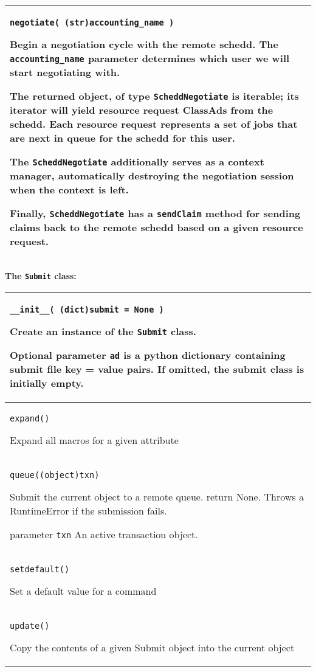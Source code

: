 \begin{flushleft}
\begin{tabular}{|p{16cm}|}
\\ \hline
\texttt{negotiate( (str)accounting\_name )}

Begin a negotiation cycle with the remote schedd.  The \texttt{accounting\_name}
parameter determines which user we will start negotiating with.

The returned object, of type \texttt{ScheddNegotiate} is iterable; its iterator
will yield resource request ClassAds from the schedd.  Each resource request represents
a set of jobs that are next in queue for the schedd for this user.

The \texttt{ScheddNegotiate} additionally serves as a context manager, automatically
destroying the negotiation session when the context is left.

Finally, \texttt{ScheddNegotiate} has a \texttt{sendClaim} method for sending claims
back to the remote schedd based on a given resource request.

\\ \hline
\end{tabular}
\end{flushleft}

\textbf{The \texttt{Submit} class:}
\begin{flushleft}
\begin{tabular}{|p{16cm}|} \hline

\texttt{\_\_init\_\_( (dict)submit = None ) }

Create an instance of the \texttt{Submit} class.  

Optional parameter \texttt{ad} is a python dictionary containing submit file key = value pairs.
If omitted, the submit class is initially empty.
\\ \hline
\texttt{expand() }

Expand all macros for a given attribute

\\ \hline
\texttt{queue((object)txn) }

Submit the current object to a remote queue.
return None. Throws a RuntimeError if the submission fails.

parameter \texttt{txn} An active transaction object.
\\ \hline
\texttt{setdefault() }

Set a default value for a command

\\ \hline
\texttt{update() }

Copy the contents of a given Submit object into the current object

\\ \hline
\end{tabular}
\end{flushleft}



